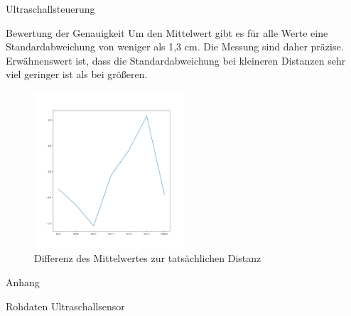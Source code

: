 \documentclass[12pt,twoside]{report}
\begin{document}
\begin{section}{Ultraschallsteuerung}
\begin{subsection}{Bewertung der Genauigkeit}
    Um den Mittelwert gibt es für alle Werte eine Standardabweichung von weniger
    als 1,3 cm. Die Messung sind daher präzise. Erwähnenswert ist, dass die
    Standardabweichung bei kleineren Distanzen sehr viel geringer ist als bei größeren.

    \begin{figure}[h!]
      \centering
      \includegraphics[width=0.5\textwidth]{test_data_ultrasonic/meanDiff.png}
      \caption{Differenz des Mittelwertes zur tatsächlichen Distanz}
    \end{figure}

  \end{subsection}

\end{section}

\begin{section}{Anhang}
  \begin{subsection}{Rohdaten Ultraschallsensor} \label{ultraschallsensorRohdaten}
    
  \end{subsection}
\end{section}
\end{document}

